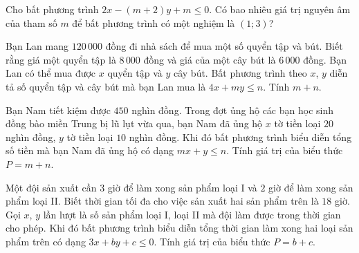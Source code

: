 \begin{ex}%
	Cho bất phương trình $2x-(m+2)y+m\le 0$. Có bao nhiêu giá trị nguyên âm của tham số $m$ để bất phương trình có một nghiệm là $(1;3)$?
\end{ex}
\begin{ex}%
	Bạn Lan mang $120\,000$ đồng đi nhà sách để mua một số quyển tập và bút. Biết rằng giá một quyển tập là $8\,000$ đồng và giá của một cây bút là $6\,000$ đồng. Bạn Lan có thể mua được $x$ quyển tập và $y$ cây bút. Bất phương trình theo $x$, $y$ diễn tả số quyển tập và cây bút mà bạn Lan mua là $4x+m y \leq n$. Tính $m+n$.
	\par{}
\end{ex}
\begin{ex}%
	Bạn Nam tiết kiệm được $450$ nghìn đồng. Trong đợt ủng hộ các bạn học sinh đồng bào miền Trung bị lũ lụt vừa qua, bạn Nam đã ủng hộ $x$ tờ tiền loại $20$ nghìn đồng, $y$ tờ tiền loại $10$ nghìn đồng. Khi đó bất phương trình biểu diễn tổng số tiền mà bạn Nam đã ủng hộ có dạng $mx+y\le n$. Tính giá trị của biểu thức $P=m+n$.
\end{ex}
\begin{ex}%
	Một đội sản xuất cần $3$ giờ để làm xong sản phẩm loại I và $2$ giờ để làm xong sản phẩm loại II. Biết thời gian tối đa cho việc sản xuất hai sản phẩm trên là $18$ giờ. Gọi $x$, $y$ lần lượt là số sản phẩm loại I, loại II mà đội làm được trong thời gian cho phép. Khi đó bất phương trình biểu diễn tổng thời gian làm xong hai loại sản phẩm trên có dạng $3x+by+c\le 0$. Tính giá trị của biểu thức $P=b+c$.
\end{ex}
